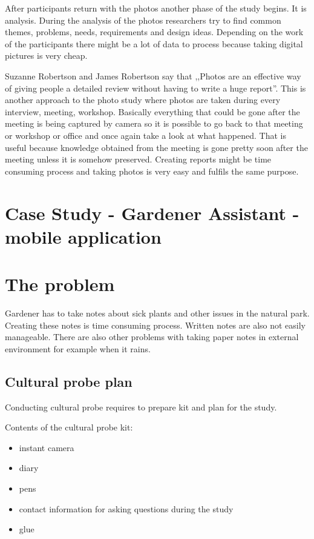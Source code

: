 \documentclass[12pt, a4paper]{article}
\begin{document}
After participants return with the photos another phase of the study begins. It is analysis. During the analysis of the photos researchers try to find common themes, problems, needs, requirements and design ideas. Depending on the work of the participants there might be a lot of data to process because taking digital pictures is very cheap.

Suzanne Robertson and James Robertson say that ,,Photos are an effective way of giving people a detailed review without having to write a huge report''. \cite{robertson2006mastering} This is another approach to the photo study where photos are taken during every interview, meeting, workshop. Basically everything that could be gone after the meeting is being captured by camera so it is possible to go back to that meeting or workshop or office and once again take a look at what happened. That is useful because knowledge obtained from the meeting is gone pretty soon after the meeting unless it is somehow preserved. Creating reports might be time consuming process and taking photos is very easy and fulfils the same purpose.




\section{Case Study - Gardener Assistant - mobile application}
\section{The problem}
Gardener has to take notes about sick plants and other issues in the natural park. Creating these notes is time consuming process. Written notes are also not easily manageable. There are also other problems with taking paper notes in external environment for example when it rains.

\subsection{Cultural probe plan}
Conducting cultural probe requires to prepare kit and plan for the study.

Contents of the cultural probe kit:
\begin{itemize}
\item instant camera
\item diary
\item pens
\item contact information for asking questions during the study
\item glue
\end{itemize}
\end{document}
